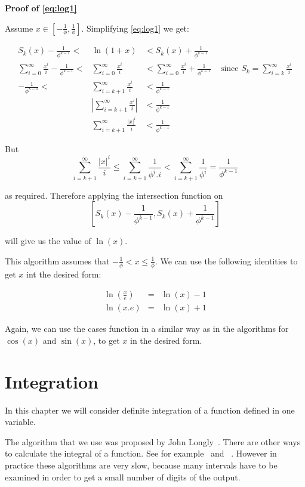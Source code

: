 \documentclass{cs4rep}
\begin{document}
{\bf Proof of \ref{eq:log1}}

Assume $x \in [-\frac{1}{\phi}, \frac{1}{\phi}]$. Simplifying
\ref{eq:log1} we get:

\[ \begin{array}{rcll}
S_{k}(x) - \frac{1}{\phi^{k-1}} < & \ln(1+x) & < S_{k}(x) + \frac{1}{\phi^{k-1}} \\
\sum_{i=0}^{\infty} \frac{x^{i}}{i} - \frac{1}{\phi^{k-1}} < & \sum_{i=0}^{\infty} \frac{x^{i}}{i} & < \sum_{i=0}^{\infty} \frac{x^{i}}{i} + \frac{1}{\phi^{k-1}} & \mbox{ since } S_{k} = \sum_{i=k}^{\infty} \frac{x^{i}}{i} \\
- \frac{1}{\phi^{k-1}} < & \sum_{i=k+1}^{\infty} \frac{x^{i}}{i} & < \frac{1}{\phi^{k-1}} \\
& |\sum_{i=k+1}^{\infty} \frac{x^{i}}{i}| & < \frac{1}{\phi^{k-1}} \\
& \sum_{i=k+1}^{\infty} \frac{|x|^{i}}{i} & < \frac{1}{\phi^{k-1}}
\end{array} \]

But
\[ \sum_{i=k+1}^{\infty} \frac{|x|^{i}}{i} \leq \sum_{i=k+1}^{\infty} \frac{1}{\phi^{i}.i} < \sum_{i=k+1}^{\infty} \frac{1}{\phi^{i}} = \frac{1}{\phi^{k-1}} \]

as required. Therefore applying the intersection function on \[
[S_{k}(x)-\frac{1}{\phi^{k-1}}, S_{k}(x)+\frac{1}{\phi^{k-1}}] \]

will give us the value of $\ln(x)$.

This algorithm assumes that $-\frac{1}{\phi} < x \leq \frac{1}{\phi}$.
We can use the following identities to get $x$ int the desired form:

\[ \begin{array}{rcl}
\ln(\frac{x}{e}) & = & \ln(x) - 1 \\
\ln(x.e) & = & \ln(x) + 1
\end{array} \]

Again, we can use the cases function in a similar way as in the algorithms
for $\cos(x)$ and $\sin(x)$, to get $x$ in the desired form.


\chapter{Integration} \label{ch:int}
In this chapter we will consider definite integration of a function
defined in one variable.

The algorithm that we use was proposed by John
Longly~\cite{kn:Longley}. There are other ways to calculate the
integral of a function. See for example~\cite{kn:Plume} and
~\cite{kn:Simpson}. However in practice these algorithms are very slow,
because many intervals have to be examined in order to get a small
number of digits of the output.
\end{document}
